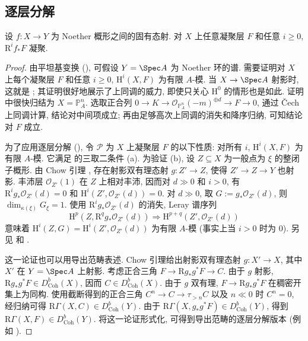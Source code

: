 \subsection{逐层分解}\label{src:A.5.2-subsection}
\begin{theorem}[上同调的有限性]\label{src:A.5.3}
设 $f:X\to Y$ 为 Noether 概形之间的固有态射. 对 $X$ 上任意凝聚层 $F$ 和任意 $i\geq0$, $\mathrm R^i f_*F$ 凝聚.
\end{theorem}
\begin{proof}
由平坦基变换 (), 可假设 $Y=\Spec A$ 为 Noether 环的谱. 需要证明对 $X$ 上每个凝聚层 $F$ 和任意 $i\geq0$, $\mathrm H^i(X,F)$ 为有限 $A$-模. 当 $X\to\Spec A$ 射影时, 这就是 \cite[定理 III.$5.2$]{Har77}; 其证明很好地展示了上同调的威力, 即使只关心 $\mathrm H^0$ 的情形也是如此. 证明中很快归结为 $X=\mathbb P_A^n$. 选取正合列 $0\to K\to\mathcal O_{\mathbb P_A^n}(-m)^{\oplus d}\to F\to0$, 通过 Čech 上同调计算, 结论对中间项成立; 再由足够高次上同调的消失和降序归纳, 可知结论对 $F$ 成立.

为了应用逐层分解 (), 令 $\mathcal P$ 为 $X$ 上凝聚层 $F$ 的以下性质: 对所有 $i$, $\mathrm H^i(X,F)$ 为有限 $A$-模. 它满足  的三取二条件 (a). 为验证 (b), 设 $Z\subseteq X$ 为一般点为 $\xi$ 的整闭子概形. 由 Chow 引理 \cite[习题 II.$4.10$]{Har77}, 存在射影双有理态射 $g:Z'\to Z$, 使得 $Z'\to Z\to Y$ 也射影. 丰沛层 $\mathcal O_{Z'}(1)$ 在 $Z$ 上相对丰沛, 因而对 $d\gg0$ 和 $i>0$, 有 $\mathrm R^i g_*\mathcal O_{Z'}(d)=0$ 和 $\mathrm H^i(Z',\mathcal O_{Z'}(d))=0$. 对 $d\gg0$, 取 $G:=g_*\mathcal O_{Z'}(d)$, 则 $\dim_{\kappa(\xi)}G_\xi=1$. 使用 $\mathrm R^i g_*\mathcal O_{Z'}(d)$ 的消失, Leray 谱序列
\[
\mathrm H^p(Z,\mathrm R^qg_*\mathcal O_{Z'}(d))\Longrightarrow\mathrm H^{p+q}(Z',\mathcal O_{Z'}(d))
\]
意味着 $\mathrm H^i(Z,G)=\mathrm H^i(Z',\mathcal O_{Z'}(d))$ 为有限 $A$-模 (事实上当 $i>0$ 时为 $0$). 另见 \cite[III$_1$.$3.2.1$]{EGA} 和 \cite[Tag 0205]{SP}.

这一论证也可以用导出范畴表述. Chow 引理给出射影双有理态射 $g:X'\to X$, 其中 $X'$ 在 $Y=\Spec A$ 上射影. 考虑正合三角 $F\to\mathrm Rg_*g^*F\to C$. 由于 $g$ 射影, $\mathrm Rg_*g^*F\in D_{\mathrm{Coh}}^b(X)$, 因而 $C\in D_{\mathrm{Coh}}^b(X)$. 由于 $g$ 双有理, $F\to\mathrm Rg_*g^*F$ 在稠密开集上为同构. 使用截断得到的正合三角 $C^n\to C\to\tau_{>n}C$ 以及 $n\ll0$ 时 $C^n=0$, 经归纳可得 $\mathrm R\Gamma(X,C)\in D_{\mathrm{Coh}}^b(Y)$. 由于 $\mathrm R\Gamma(X,g_*g^*F)\in D_{\mathrm{Coh}}^b(Y)$, 得到 $\mathrm R\Gamma(X,F)\in D_{\mathrm{Coh}}^b(Y)$. 将这一论证形式化, 可得到导出范畴的逐层分解版本 (例如 \cite[引理 $15.7$]{LMB00}).
\end{proof}
